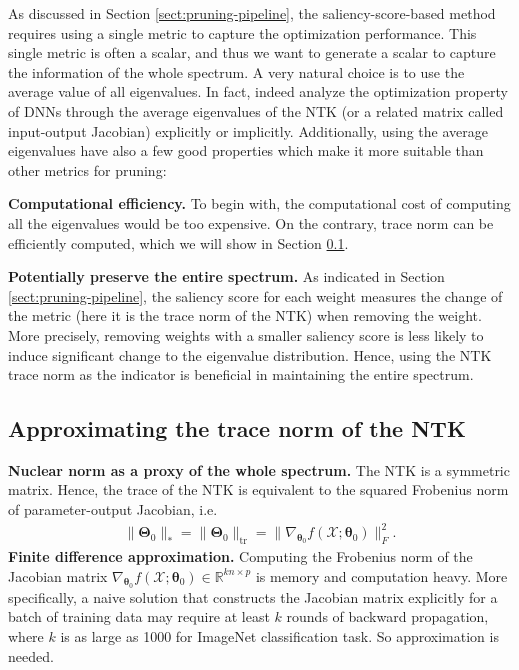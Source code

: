 \documentclass{article} %
\begin{document}
As discussed in Section \ref{sect:pruning-pipeline}, the saliency-score-based method requires using a single metric to capture the optimization performance. This single metric is often a scalar, and thus we want to generate a scalar to capture the information of the whole spectrum. A very natural choice is to use the average value of all eigenvalues. In fact, \citet{pennington2017resurrecting, pennington2018emergence, nasi} indeed analyze the optimization property of DNNs through the average eigenvalues of the NTK (or a related matrix called input-output Jacobian) explicitly or implicitly.
Additionally, using the average eigenvalues have also a few good properties which make it more suitable than other metrics for pruning:

\textbf{Computational efficiency.} To begin with, the computational cost of computing all the eigenvalues would be too expensive. On the contrary, trace norm can be efficiently computed, which we will show in Section \ref{sect:ntk-formulation}.

\textbf{Potentially preserve the entire spectrum.}  As indicated in Section \ref{sect:pruning-pipeline}, the saliency score for each weight measures the change of the metric (here it is the trace norm of the NTK) when removing the weight. More precisely, removing weights with a smaller saliency score is less likely to induce significant change to the eigenvalue distribution. Hence, using the NTK trace norm as the indicator is beneficial in maintaining the entire spectrum.

\subsection{Approximating the trace norm of the NTK} \label{sect:ntk-formulation}

\textbf{Nuclear norm as a proxy of the whole spectrum.} The NTK is a symmetric matrix. Hence, the trace of the NTK is equivalent to the squared Frobenius norm of parameter-output Jacobian, i.e.
\begin{align}
    \|\boldsymbol{\Theta}_0\|_{*}=\|\boldsymbol{\Theta}_0\|_\text{tr}=\|\nabla_{\boldsymbol{\theta}_0}f(\mathcal{X};\boldsymbol{\theta}_0)\|_{F}^2.
\end{align}
\textbf{Finite difference approximation.} Computing the Frobenius norm of the Jacobian matrix $\nabla_{\boldsymbol{\theta}_0}f(\mathcal{X};\boldsymbol{\theta}_0) \in \mathbb{R}^{kn \times p}$ is memory and computation heavy. More specifically, a naive solution that constructs the Jacobian matrix explicitly for a batch of training data may require at least $k$ rounds of backward propagation, where $k$ is as large as 1000 for ImageNet classification task. So approximation is needed. 
\end{document}
